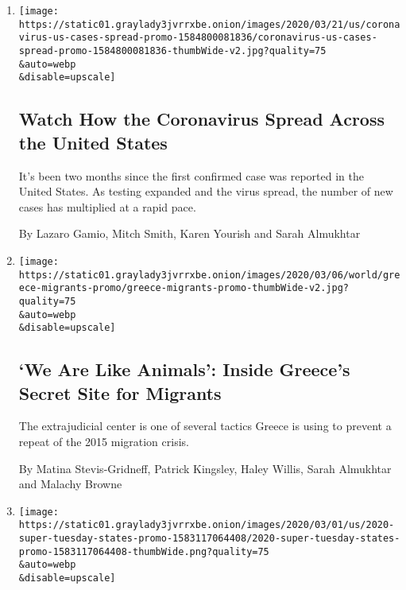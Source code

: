 \begin{enumerate}
\def\labelenumi{\arabic{enumi}.}
\item
  \href{/interactive/2020/03/21/us/coronavirus-us-cases-spread.html}{}

  \texttt{[image: https://static01.graylady3jvrrxbe.onion/images/2020/03/21/us/coronavirus-us-cases-spread-promo-1584800081836/coronavirus-us-cases-spread-promo-1584800081836-thumbWide-v2.jpg?quality=75\\\&auto=webp\\\&disable=upscale]}

  \hypertarget{watch-how-the-coronavirus-spread-across-the-united-states}{%
  \subsection{Watch How the Coronavirus Spread Across the United
  States}\label{watch-how-the-coronavirus-spread-across-the-united-states}}

  It's been two months since the first confirmed case was reported in
  the United States. As testing expanded and the virus spread, the
  number of new cases has multiplied at a rapid pace.

  By Lazaro Gamio, Mitch Smith, Karen Yourish and Sarah Almukhtar
\item
  \href{/2020/03/10/world/europe/greece-migrants-secret-site.html}{}

  \texttt{[image: https://static01.graylady3jvrrxbe.onion/images/2020/03/06/world/greece-migrants-promo/greece-migrants-promo-thumbWide-v2.jpg?quality=75\\\&auto=webp\\\&disable=upscale]}

  \hypertarget{we-are-like-animals-inside-greeces-secret-site-for-migrants}{%
  \subsection{`We Are Like Animals': Inside Greece's Secret Site for
  Migrants}\label{we-are-like-animals-inside-greeces-secret-site-for-migrants}}

  The extrajudicial center is one of several tactics Greece is using to
  prevent a repeat of the 2015 migration crisis.

  By Matina Stevis-Gridneff, Patrick Kingsley, Haley Willis, Sarah
  Almukhtar and Malachy Browne
\item
  \href{/interactive/2020/03/02/us/politics/2020-super-tuesday-states.html}{}

  \texttt{[image: https://static01.graylady3jvrrxbe.onion/images/2020/03/01/us/2020-super-tuesday-states-promo-1583117064408/2020-super-tuesday-states-promo-1583117064408-thumbWide.png?quality=75\\\&auto=webp\\\&disable=upscale]}


\end{enumerate}

